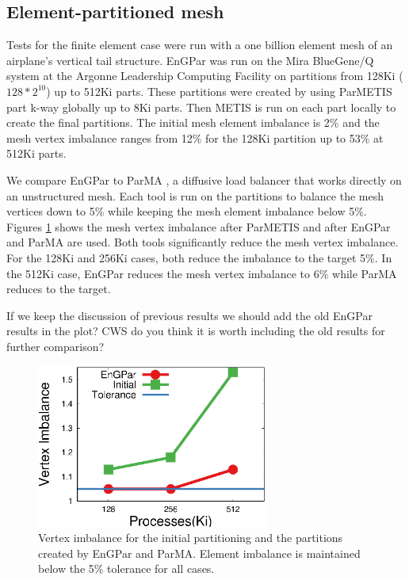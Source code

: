 \documentclass[conference]{IEEEtran}
\begin{document}
\subsection{Element-partitioned mesh}

Tests for the finite element case were run with a one billion element mesh of an airplane's
vertical tail structure. EnGPar was run on the Mira BlueGene/Q system at the Argonne Leadership
Computing Facility \cite{haring2012ibm} on partitions from 128Ki ($128*2^{10}$) up to 512Ki parts.
These partitions were created by using ParMETIS part k-way \cite{karypis1999parallel} globally
up to 8Ki parts. Then METIS is run on each part locally to create the final partitions.
The initial mesh element imbalance is 2\% and the mesh vertex imbalance ranges from 12\% for
the 128Ki partition up to 53\% at 512Ki parts.

We compare EnGPar to ParMA \cite{SmithParma2015}, a diffusive load balancer that
works directly on an unstructured mesh.
Each tool is run on the partitions to balance the mesh vertices down to 5\% while keeping the mesh
element imbalance below 5\%. Figures \ref{fig:fem_vtximb} shows the mesh vertex imbalance after
ParMETIS and after EnGPar and ParMA are used. Both tools significantly reduce the mesh vertex
imbalance. For the 128Ki and 256Ki cases, both reduce the imbalance to the target 5\%. In
the 512Ki case, EnGPar reduces the mesh vertex imbalance to 6\% while ParMA reduces to the
target.

{\color{red} If we keep the discussion of previous results we should add the old EnGPar results in the plot? CWS do you think it is worth including the old results for further comparison?}
\begin{figure}[!ht]
  \centering
  \includegraphics[width=3in]{plots/mira_fem_results/vimb_v_cores}
  \caption{Vertex imbalance for the initial partitioning and the partitions created by
    EnGPar and ParMA. Element imbalance is maintained below the 5\% tolerance for all cases.}
  \label{fig:fem_vtximb}
\end{figure}
\end{document}
